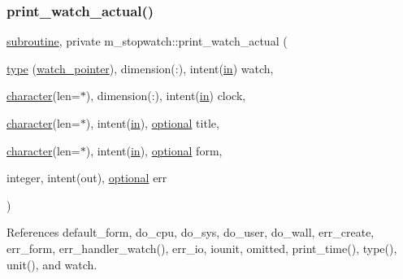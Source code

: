 \subsubsection{\texorpdfstring{print\+\_\+watch\+\_\+actual()}{print\_watch\_actual()}}
{\footnotesize\ttfamily \hyperlink{M__stopwatch_83_8txt_acfbcff50169d691ff02d4a123ed70482}{subroutine}, private m\+\_\+stopwatch\+::print\+\_\+watch\+\_\+actual (\begin{DoxyParamCaption}\item[{\hyperlink{stop__watch_83_8txt_a70f0ead91c32e25323c03265aa302c1c}{type} (\hyperlink{structm__stopwatch_1_1watch__pointer}{watch\+\_\+pointer}), dimension(\+:), intent(\hyperlink{M__journal_83_8txt_afce72651d1eed785a2132bee863b2f38}{in})}]{watch,  }\item[{\hyperlink{option__stopwatch_83_8txt_abd4b21fbbd175834027b5224bfe97e66}{character}(len=$\ast$), dimension(\+:), intent(\hyperlink{M__journal_83_8txt_afce72651d1eed785a2132bee863b2f38}{in})}]{clock,  }\item[{\hyperlink{option__stopwatch_83_8txt_abd4b21fbbd175834027b5224bfe97e66}{character}(len=$\ast$), intent(\hyperlink{M__journal_83_8txt_afce72651d1eed785a2132bee863b2f38}{in}), \hyperlink{option__stopwatch_83_8txt_aa4ece75e7acf58a4843f70fe18c3ade5}{optional}}]{title,  }\item[{\hyperlink{option__stopwatch_83_8txt_abd4b21fbbd175834027b5224bfe97e66}{character}(len=$\ast$), intent(\hyperlink{M__journal_83_8txt_afce72651d1eed785a2132bee863b2f38}{in}), \hyperlink{option__stopwatch_83_8txt_aa4ece75e7acf58a4843f70fe18c3ade5}{optional}}]{form,  }\item[{integer, intent(out), \hyperlink{option__stopwatch_83_8txt_aa4ece75e7acf58a4843f70fe18c3ade5}{optional}}]{err }\end{DoxyParamCaption})\hspace{0.3cm}{\ttfamily [private]}}



References default\+\_\+form, do\+\_\+cpu, do\+\_\+sys, do\+\_\+user, do\+\_\+wall, err\+\_\+create, err\+\_\+form, err\+\_\+handler\+\_\+watch(), err\+\_\+io, iounit, omitted, print\+\_\+time(), type(), unit(), and watch.

\mbox{\label{namespacem__stopwatch_a8c401a6a0108a2cd08e46cc5c9694f81}} 
